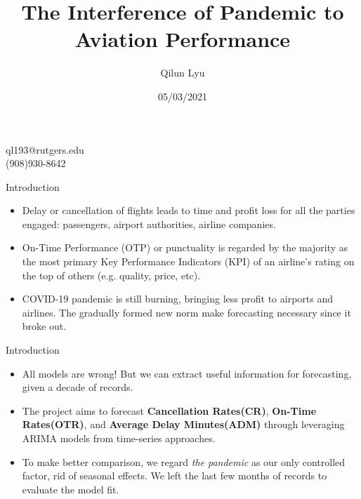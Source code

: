 \documentclass[11pt]{beamer}
\author{Qilun Lyu}
\title{The Interference of Pandemic to Aviation Performance}
\date{05/03/2021}
\institute{Rutgers University}
\begin{document}
\begin{frame}
\titlepage
\center \small
ql193@rutgers.edu \\
(908)930-8642
\end{frame}

\begin{frame}{Introduction}
\begin{itemize}
\item Delay or cancellation of flights leads to time and profit loss for all the parties engaged: passengers,  airport authorities,  airline companies.
\item On-Time Performance (OTP) or punctuality is regarded by the
majority as the most primary Key Performance Indicators
(KPI) of an airline's rating on the top of others (e.g. quality,
price, etc).  
\item  COVID-19 pandemic is still burning,  bringing less profit
to airports and airlines. The gradually formed new norm
make forecasting necessary since it broke
out. 
\end{itemize}
\end{frame}

\begin{frame}{Introduction}
\begin{itemize}
\item All models are wrong! But we can extract useful information for forecasting,  given a decade of records.

\item The project aims to forecast {\bf Cancellation
Rates(CR)}, {\bf On-Time Rates(OTR)}, and {\bf Average Delay Minutes(ADM)} through leveraging
ARIMA models from time-series approaches.

\item To make better comparison, we regard {\it the pandemic} as our only controlled factor, rid of seasonal effects.  We left the last few months of records to evaluate the model fit.
\end{itemize}
\end{frame}
\end{document}
